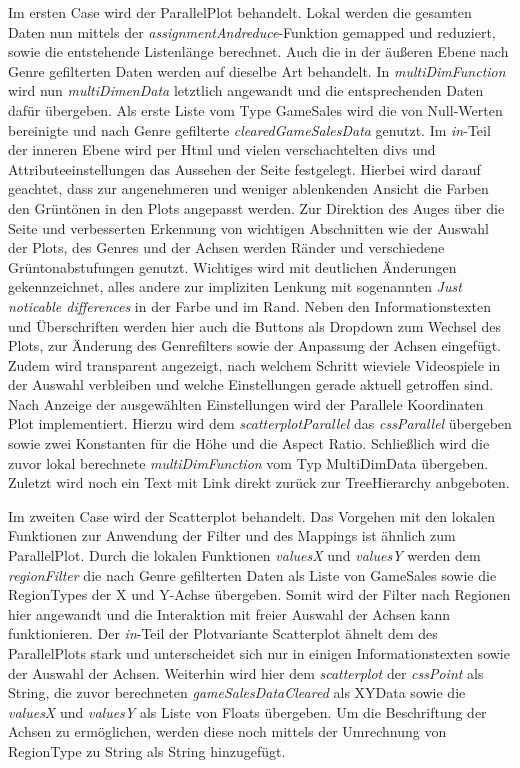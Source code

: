 \documentclass[usegeometry=true]{scrartcl}
\begin{document}
Im ersten Case wird der ParallelPlot behandelt. Lokal werden die gesamten Daten nun mittels der \textit{assignmentAndreduce}-Funktion gemapped und reduziert, sowie die entstehende Listenlänge berechnet. 
Auch die in der äußeren Ebene nach Genre gefilterten Daten werden auf dieselbe Art behandelt. 
In \textit{multiDimFunction} wird nun \textit{multiDimenData} letztlich angewandt und die entsprechenden Daten dafür übergeben. 
Als erste Liste vom Type GameSales wird die von Null-Werten bereinigte und nach Genre gefilterte \textit{clearedGameSalesData} genutzt.
Im \textit{in}-Teil der inneren Ebene wird per Html und vielen verschachtelten divs und Attributeeinstellungen das Aussehen der Seite festgelegt.
Hierbei wird darauf geachtet, dass zur angenehmeren und weniger ablenkenden Ansicht die Farben den Grüntönen in den Plots angepasst werden. 
Zur Direktion des Auges über die Seite und verbesserten Erkennung von wichtigen Abschnitten wie der Auswahl der Plots, des Genres und der Achsen werden Ränder und verschiedene Grüntonabstufungen genutzt.
Wichtiges wird mit deutlichen Änderungen gekennzeichnet, alles andere zur impliziten Lenkung mit sogenannten \textit{Just noticable differences} in der Farbe und im Rand.
Neben den Informationstexten und Überschriften werden hier auch die Buttons als Dropdown zum Wechsel des Plots, zur Änderung des Genrefilters sowie der Anpassung der Achsen eingefügt.
Zudem wird transparent angezeigt, nach welchem Schritt wieviele Videospiele in der Auswahl verbleiben und welche Einstellungen gerade aktuell getroffen sind.
Nach Anzeige der ausgewählten Einstellungen wird der Parallele Koordinaten Plot implementiert. Hierzu wird dem \textit{scatterplotParallel} das \textit{cssParallel} übergeben sowie zwei Konstanten für die Höhe und die Aspect Ratio.
Schließlich wird die zuvor lokal berechnete \textit{multiDimFunction} vom Typ MultiDimData übergeben. 
Zuletzt wird noch ein Text mit Link direkt zurück zur TreeHierarchy anbgeboten.

Im zweiten Case wird der Scatterplot behandelt. Das Vorgehen mit den lokalen Funktionen zur Anwendung der Filter und des Mappings ist ähnlich zum ParallelPlot.
Durch die lokalen Funktionen \textit{valuesX} und \textit{valuesY} werden dem \textit{regionFilter} die nach Genre gefilterten Daten als Liste von GameSales sowie die RegionTypes der X und Y-Achse übergeben.
Somit wird der Filter nach Regionen hier angewandt und die Interaktion mit freier Auswahl der Achsen kann funktionieren.
Der \textit{in}-Teil der Plotvariante Scatterplot ähnelt dem des ParallelPlots stark und unterscheidet sich nur in einigen Informationstexten sowie der Auswahl der Achsen.
Weiterhin wird hier dem \textit{scatterplot} der \textit{cssPoint} als String, die zuvor berechneten \textit{gameSalesDataCleared} als XYData sowie die \textit{valuesX} und \textit{valuesY} als Liste von Floats übergeben.
Um die Beschriftung der Achsen zu ermöglichen, werden diese noch mittels der Umrechnung von RegionType zu String als String hinzugefügt.
\end{document}
